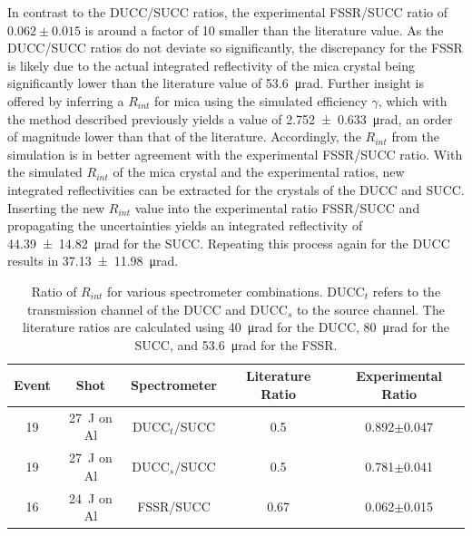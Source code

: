 In contrast to the DUCC/SUCC ratios, the experimental FSSR/SUCC ratio of $0.062\pm0.015$ is around a factor of 10 smaller than the literature value. As the DUCC/SUCC ratios do not deviate so significantly, the discrepancy for the FSSR is likely due to the actual integrated reflectivity of the mica crystal being significantly lower than the literature value of \SI{53.6}{\micro\radian}. Further insight is offered by inferring a $R_{int}$ for mica using the simulated efficiency $\gamma$, which with the method described previously yields a value of \SI{2.752\pm0.633}{\micro\radian}, an order of magnitude lower than that of the literature. Accordingly, the $R_{int}$ from the simulation is in better agreement with the experimental FSSR/SUCC ratio. With the simulated $R_{int}$ of the mica crystal and the experimental ratios, new integrated reflectivities can be extracted for the crystals of the DUCC and SUCC. Inserting the new $R_{int}$ value into the experimental ratio FSSR/SUCC and propagating the uncertainties yields an integrated reflectivity of \SI{44.39\pm14.82}{\micro\radian} for the SUCC. Repeating this process again for the DUCC results in \SI{37.13\pm11.98}{\micro\radian}. 


\begin{table}[H]
	\centering
	\caption{Ratio of $R_{int}$ for various spectrometer combinations. DUCC$_t$ refers to the transmission channel of the DUCC and DUCC$_s$ to the source channel. The literature ratios are calculated using \SI{40}{\micro\radian} for the DUCC, \SI{80}{\micro\radian} for the SUCC, and \SI{53.6}{\micro\radian} for the FSSR.}
	\vspace{0.05cm}
	\renewcommand{\arraystretch}{1.5}
	\centering
	\begin{tabular}{|c|c|c|c|c|} 
		\hline
		Event & Shot & Spectrometer & Literature Ratio & Experimental Ratio \\ 
		[0.5ex]
		\hline\hline
		19 & \SI{27}{\joule} on Al & DUCC$_t$/SUCC & 0.5 & 0.892$\pm$0.047 \\ 
		[0.5ex]
		\hline
		19 & \SI{27}{\joule} on Al & DUCC$_s$/SUCC & 0.5 & 0.781$\pm$0.041 \\ 
		[0.5ex]
		\hline
		16 & \SI{24}{\joule} on Al & FSSR/SUCC & 0.67 & 0.062$\pm$0.015 \\ 
		[0.5ex]
		\hline
	\end{tabular}
	\label{Table: Rint Ratio}
\end{table}

